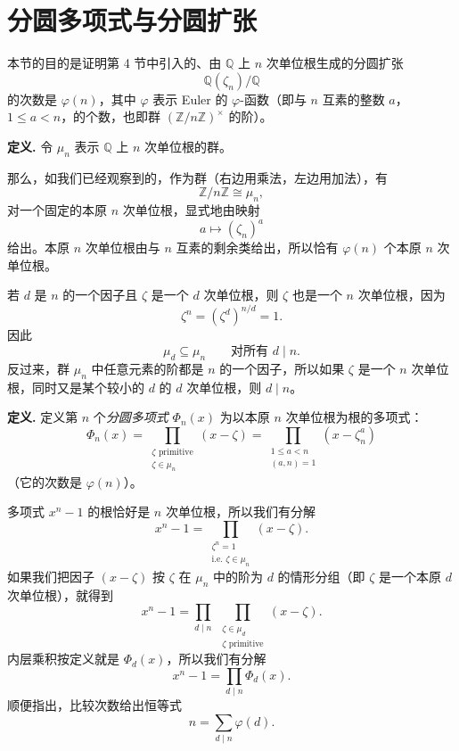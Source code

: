 \section{分圆多项式与分圆扩张}

本节的目的是证明第 4 节中引入的、由 $\mathbb Q$ 上 $n$ 次单位根生成的分圆扩张
\[
\mathbb Q(\zeta_n)/\mathbb Q
\]
的次数是 $\varphi(n)$，其中 $\varphi$ 表示 Euler 的 $\varphi$-函数（即与 $n$ 互素的整数 $a$，$1\leq a<n$，的个数，也即群 $(\mathbb Z/n\mathbb Z)^\times$ 的阶）。

\noindent\textbf{定义.} 令 $\mu_n$ 表示 $\mathbb Q$ 上 $n$ 次单位根的群。

那么，如我们已经观察到的，作为群（右边用乘法，左边用加法），有
\[
\mathbb Z/n\mathbb Z\cong \mu_n,
\]
对一个固定的本原 $n$ 次单位根，显式地由映射
\[
a\longmapsto (\zeta_n)^a
\]
给出。本原 $n$ 次单位根由与 $n$ 互素的剩余类给出，所以恰有 $\varphi(n)$ 个本原 $n$ 次单位根。

若 $d$ 是 $n$ 的一个因子且 $\zeta$ 是一个 $d$ 次单位根，则 $\zeta$ 也是一个 $n$ 次单位根，因为
\[
\zeta^n=(\zeta^d)^{n/d}=1.
\]
因此
\[
\mu_d\subseteq \mu_n \qquad \text{对所有 } d\mid n.
\]
反过来，群 $\mu_n$ 中任意元素的阶都是 $n$ 的一个因子，所以如果 $\zeta$ 是一个 $n$ 次单位根，同时又是某个较小的 $d$ 的 $d$ 次单位根，则 $d\mid n$。

\noindent\textbf{定义.} 定义第 $n$ 个\emph{分圆多项式} $\Phi_n(x)$ 为以本原 $n$ 次单位根为根的多项式：
\[
\Phi_n(x)=\prod_{\substack{\zeta\text{ primitive}\\ \zeta\in\mu_n}}(x-\zeta)
=\prod_{\substack{1\leq a<n\\ (a,n)=1}}(x-\zeta_n^a)
\]
（它的次数是 $\varphi(n)$）。

多项式 $x^n-1$ 的根恰好是 $n$ 次单位根，所以我们有分解
\[
x^n-1=\prod_{\substack{\zeta^n=1\\ \text{i.e. }\zeta\in\mu_n}}(x-\zeta).
\]
如果我们把因子 $(x-\zeta)$ 按 $\zeta$ 在 $\mu_n$ 中的阶为 $d$ 的情形分组（即 $\zeta$ 是一个本原 $d$ 次单位根），就得到
\[
x^n-1=\prod_{d\mid n}\ \prod_{\substack{\zeta\in\mu_d\\ \zeta\text{ primitive}}}(x-\zeta).
\]
内层乘积按定义就是 $\Phi_d(x)$，所以我们有分解
\[
x^n-1=\prod_{d\mid n}\Phi_d(x). \tag{13.4}
\]
顺便指出，比较次数给出恒等式
\[
n=\sum_{d\mid n}\varphi(d).
\]

